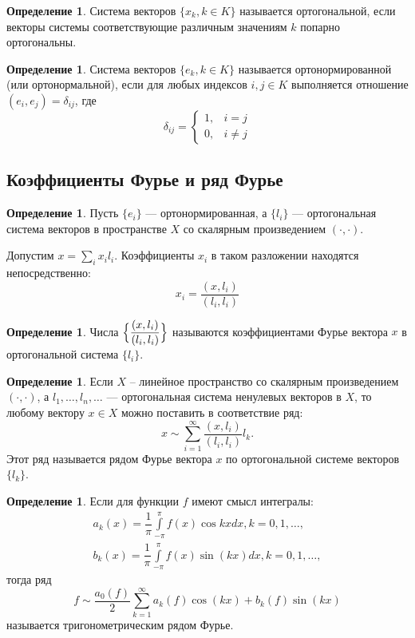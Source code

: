 \documentclass[12pt]{report}
\theoremstyle{definition}
\newtheorem{definition}[theorem]{Определение}
\begin{document}
\begin{definition}
Система векторов $\{x_k, k \in K\}$ называется ортогональной, если векторы системы
соответствующие различным значениям $k$ попарно ортогональны.
\end{definition}

\begin{definition}
Система векторов $\{e_k, k \in K\}$ называется ортонормированной (или ортонормальной),
если для любых индексов $i, j \in K$ выполняется отношение $(e_i, e_j) = \delta_{ij}$,
где
$$
\delta_{ij} = \left\{\begin{matrix} 
1, &  i=j  \\ 
0, &  i \ne j \end{matrix}\right.
$$
\end{definition}

\subsection{Коэффициенты Фурье и ряд Фурье}
\begin{definition}
Пусть $\{e_i\}$ --- ортонормированная, а $\{l_i\}$ --- ортогональная
система векторов в пространстве $X$ со скалярным произведением $(\cdot, \cdot)$.
\end{definition}

Допустим $x = \sum\limits_i x_i l_i$. Коэффициенты $x_i$ в таком разложении
находятся непосредственно:
$$
x_i = \dfrac{(x,l_i)}{(l_i, l_i)}
$$

\begin{definition}
Числа $\Bigl \{\dfrac{(x,l_i)}{(l_i, l_i)}\Bigl \}$ называются коэффициентами
Фурье вектора $x$ в ортогональной система $\{l_i\}$.
\end{definition}

\begin{definition}
Если $X$ -- линейное пространство со скалярным произведением
$(\cdot, \cdot)$, а $l_1, \dots, l_n, \dots$ --- ортогональная
система ненулевых векторов в $X$, то любому вектору $x \in X$
можно поставить в соответствие ряд:
$$
x \sim \sum\limits_{i = 1}^\infty \dfrac{(x, l_i)}{(l_i, l_i)} l_k.
$$
Этот ряд называется рядом Фурье вектора $x$ по ортогональной системе
векторов $\{l_k\}$.
\end{definition}

\begin{definition}
Если для функции $f$ имеют смысл интегралы:
\begin{gather*}
a_k(x) = \dfrac{1}{\pi} \int\limits_{-\pi}^{\pi} f(x) \cos kx dx, k = 0, 1, \dots, \\
b_k(x) = \dfrac{1}{\pi} \int\limits_{-\pi}^{\pi} f(x) \sin(kx) dx, k = 0, 1, \dots,
\end{gather*}
тогда ряд
$$
f \sim \dfrac{a_0(f)}{2} \sum\limits_{k = 1}^{\infty} a_k(f) \cos(kx) + b_k(f) \sin(kx)
$$
называется тригонометрическим рядом Фурье.
\end{definition}
\end{document}
